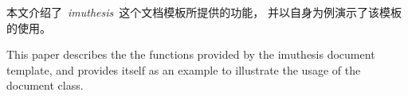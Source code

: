 \begin{cabstract}   %
    本文介绍了~\emph{imuthesis}~这个文档模板所提供的功能，
    并以自身为例演示了该模板的使用。

\end{cabstract}
    
\begin{eabstract}
    This paper describes the the functions provided by the imuthesis document template, 
    and provides itself as an example to illustrate the usage of the document class.
    
\end{eabstract}